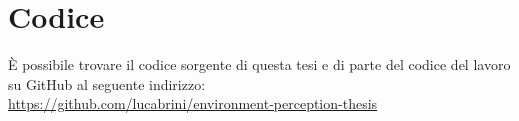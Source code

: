\section{Codice}
È possibile trovare il codice sorgente di questa tesi e di parte del codice del lavoro su GitHub al seguente indirizzo:\\
\url{https://github.com/lucabrini/environment-perception-thesis}